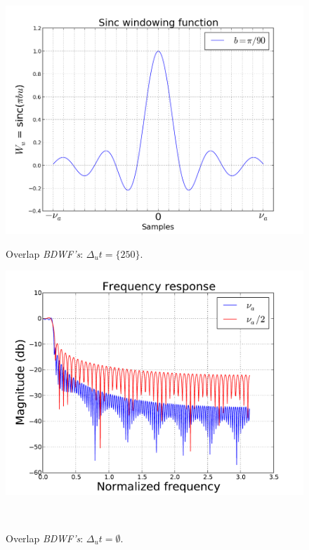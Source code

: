 \documentclass[useAMS,usenatbib]{mn2e}
\begin{document}
\begin{figure}
\begin{minipage}{0.36\linewidth}\includegraphics[width=1\textwidth]{./Figures/sinc.png}\caption{Overlap 
		\textit{BDWF's}: $\Delta_u t=\{250\}$.}\label{fig:fig_sinc}\end{minipage}
\begin{minipage}{0.36\linewidth}\includegraphics[width=1\textwidth]{./Figures/freq_resp_sinc.pdf}\caption{Overlap 
		\textit{BDWF's}: $\Delta_u t=\emptyset$.}\label{fig:fig_sinc_freq}\end{minipage}\\

\end{figure}
\end{document}
